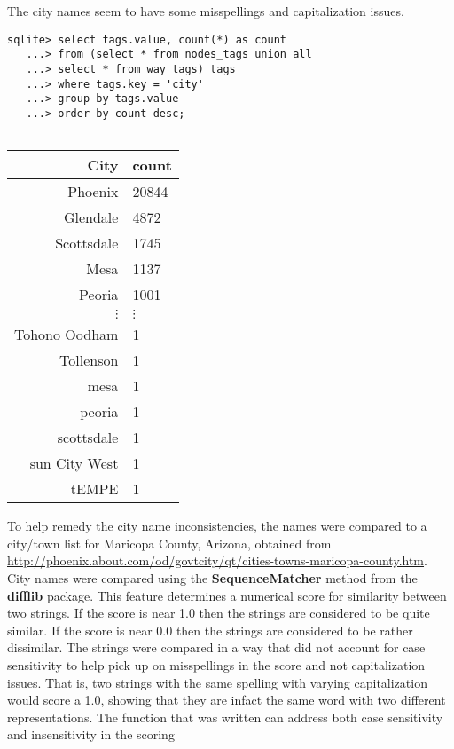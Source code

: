 \documentclass{article}
\begin{document}
The city names seem to have some misspellings and capitalization issues. 

\begin{minipage}{0.5\textwidth}
\begin{verbatim}
sqlite> select tags.value, count(*) as count
   ...> from (select * from nodes_tags union all
   ...> select * from way_tags) tags
   ...> where tags.key = 'city'
   ...> group by tags.value
   ...> order by count desc;
   
\end{verbatim}
\end{minipage}
\begin{minipage}[r]{0.45\textwidth}
\begin{tabular}{r|l}
City&count\\\hline
Phoenix&20844\\
Glendale&4872\\
Scottsdale&1745\\
Mesa&1137\\
Peoria&1001\\
$\vdots$&$\vdots$\\

Tohono Oodham&1\\
Tollenson&1\\
mesa&1\\
peoria&1\\
scottsdale&1\\
sun City West&1\\
tEMPE&1\\
\end{tabular}
\end{minipage}

To help remedy the city name inconsistencies, the names were compared to a city/town list for Maricopa County, Arizona, obtained from \url{http://phoenix.about.com/od/govtcity/qt/cities-towns-maricopa-county.htm}.  City names were compared using the \textbf{ SequenceMatcher} method from the \textbf{ difflib} package.  This feature determines a numerical score for similarity between two strings.  If the score is near 1.0 then the strings are considered to be quite similar.  If the score is near 0.0 then the strings are considered to be rather dissimilar.  The strings were compared in a way that did not account for case sensitivity to help pick up on misspellings in the score and not capitalization issues. That is, two strings with the same spelling with varying capitalization would score a 1.0, showing that they are infact the same word with two different representations. The function that was written can address both case sensitivity and insensitivity in the scoring
\end{document}
